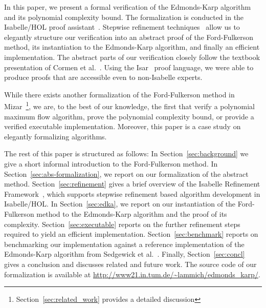 \documentclass{llncs}
\begin{document}
In this paper, we present a formal verification of the Edmonds-Karp algorithm and its polynomial complexity bound.
The formalization is conducted in the Isabelle/HOL proof assistant~\cite{NPW02}. 
Stepwise refinement techniques~\cite{Wirth71,Back78,BaWr98} allow us to elegantly structure our verification into an abstract proof of the Ford-Fulkerson method,
its instantiation to the Edmonds-Karp algorithm, and finally an efficient implementation. The abstract parts of our verification closely follow the textbook presentation of Cormen et al.~\cite{CLRS09}. Using the Isar~\cite{Wenzel99} proof language, we were able to produce proofs that are accessible even to non-Isabelle experts.

While there exists another formalization of the Ford-Fulkerson method in Mizar~\cite{Lee05}\footnote{Section~\ref{sec:related_work} provides a detailed discussion}, we are, to the best of our knowledge, the first that verify a polynomial maximum flow algorithm, prove the polynomial complexity bound, or provide a verified executable implementation. Moreover, this paper is a case study on elegantly formalizing algorithms.

The rest of this paper is structured as follows: In Section~\ref{sec:background} we give a short informal introduction to the Ford-Fulkerson method.
In Section~\ref{sec:abs-formalization}, we report on our formalization of the abstract method. 
Section~\ref{sec:refinement} gives a brief overview of the Isabelle Refinement Framework~\cite{LaTu12,La12}, which supports stepwise refinement based algorithm development in Isabelle/HOL. In Section~\ref{sec:edka}, we report on our instantiation of the Ford-Fulkerson method to the Edmonds-Karp algorithm and the proof of its complexity.
Section~\ref{sec:executable} reports on the further refinement steps required to yield an efficient implementation. Section~\ref{sec:benchmark} reports on 
benchmarking our implementation against a reference implementation of the Edmonds-Karp algorithm from Sedgewick et al.~\cite{SeWa11}. 
Finally, Section~\ref{sec:concl} gives a conclusion and discusses related and future work. The source code of our formalization is available at \url{http://www21.in.tum.de/~lammich/edmonds_karp/}.


\end{document}
